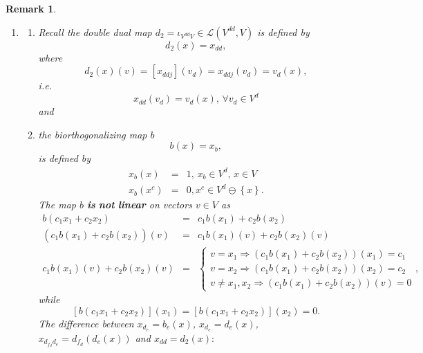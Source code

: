 \documentclass[aps,preprint]{revtex4}
\newtheorem{remark}[theorem]{Remark}
\begin{document}
\begin{remark}
\begin{enumerate}
\item 
\begin{enumerate}
\item Recall the double dual map $d_{2}=\iota _{V^{dd}V}\in \mathcal{L}%
\left( V^{dd},V\right) $ is defined by 
\begin{equation}
d_{2}\left( x\right) =x_{dd},
\end{equation}%
where 
\begin{equation}
d_{2}\left( x\right) \left( v\right) =\left[ x_{ddj}\right] \left(
v_{d}\right) =x_{ddj}\left( v_{d}\right) =v_{d}\left( x\right) ,
\end{equation}%
i.e. 
\begin{equation}
x_{dd}\left( v_{d}\right) =v_{d}\left( x\right) ,\,\forall v_{d}\in V^{d}
\end{equation}%
and

\item the biorthogonalizing map $b$ 
\begin{equation}
b\left( x\right) =x_{b},
\end{equation}%
is defined by 
\begin{eqnarray}
x_{b}\left( x\right) &=&1,\,x_{b}\in V^{d},\,x\in V \\
x_{b}\left( x^{c}\right) &=&0,x^{c}\in V^{d}\ominus \left\{ x\right\} .
\end{eqnarray}%
The map $b$ \textbf{is} \textbf{not} \textbf{linear} on vectors $v\in V$ as 
\begin{eqnarray}
b\left( c_{1}x_{1}+c_{2}x_{2}\right) &=&c_{1}b\left( x_{1}\right)
+c_{2}b\left( x_{2}\right) \\
\left( \overset{}{c_{1}b\left( x_{1}\right) +c_{2}b\left( x_{2}\right) }%
\right) \left( \overset{}{v}\right) &=&c_{1}b\left( x_{1}\right) \left(
v\right) +c_{2}b\left( x_{2}\right) \left( v\right) \\
c_{1}b\left( x_{1}\right) \left( v\right) +c_{2}b\left( x_{2}\right) \left(
v\right) &=&\left\{ 
\begin{array}{c}
v=x_{1}\Rightarrow \left( c_{1}b\left( x_{1}\right) +c_{2}b\left(
x_{2}\right) \right) \left( x_{1}\right) =c_{1} \\ 
v=x_{2}\Rightarrow \left( c_{1}b\left( x_{1}\right) +c_{2}b\left(
x_{2}\right) \right) \left( x_{2}\right) =c_{2} \\ 
v\neq x_{1},x_{2}\Rightarrow \left( c_{1}b\left( x_{1}\right) +c_{2}b\left(
x_{2}\right) \right) \left( v\right) =0%
\end{array}%
\right. ,
\end{eqnarray}%
while 
\begin{equation}
\left[ b\left( c_{1}x_{1}+c_{2}x_{2}\right) \right] \left( x_{1}\right) =%
\left[ b\left( c_{1}x_{1}+c_{2}x_{2}\right) \right] \left( x_{2}\right) =0.
\end{equation}%
The difference between $x_{d_{e}}=b_{e}\left( x\right) $, $%
x_{d_{e}}=d_{e}\left( x\right) $, $x_{d_{f_{d}}d_{e}}=d_{f_{d}}\left(
d_{e}\left( x\right) \right) $ and $x_{dd}=d_{2}\left( x\right) :$
\end{enumerate}


\end{enumerate}
\end{remark}
\end{document}
